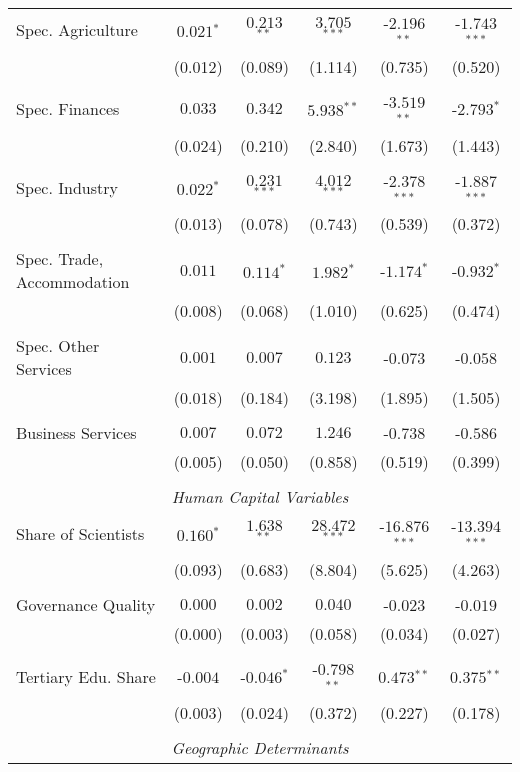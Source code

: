 \documentclass[11pt]{article}
\begin{document}
\begin{table}[!htbp]
{\begin{minipage}{\textwidth}
\begin{tabular}{@{\extracolsep{5pt}} lccccc}
Spec. Agriculture & $0.021$$^{*}$ & $0.213$$^{**}$ & $3.705$$^{***}$ & $ $-$2.196$$^{**}$ & $ $-$1.743$$^{***}$ \\ 
& (0.012) &  (0.089) & (1.114) & (0.735) & (0.520)\\
&\\
Spec. Finances  & $0.033$ & $0.342$ & $5.938$$^{**}$ & $ $-$3.519$$^{**}$ & $ $-$2.793$$^{*}$ \\ 
& (0.024) &  (0.210) & (2.840) & (1.673) & (1.443)\\
&\\
Spec. Industry & $0.022$$^{*}$ & $0.231$$^{***}$ & $4.012$$^{***}$ & $ $-$2.378$$^{***}$ & $ $-$1.887$$^{***}$ \\ 
& (0.013) &  (0.078) & (0.743) & (0.539) & (0.372)\\
&\\
Spec. Trade, Accommodation & $0.011$ & $0.114$$^{*}$ & $1.982$$^{*}$ & $ $-$1.174$$^{*}$ & $ $-$0.932$$^{*}$ \\
& (0.008) &  (0.068) & (1.010) & (0.625) & (0.474)\\
&\\
Spec. Other Services & $ 0.001$ & $ 0.007$ & $ 0.123$ & $ $-$0.073$ & $ $-$0.058$ \\
& (0.018) &  (0.184) & (3.198) & (1.895) & (1.505)\\
&\\
Business Services & $0.007$ & $0.072$ & $1.246$ & $ $-$0.738$ & $ $-$0.586$ \\
& (0.005) &  (0.050) & (0.858) & (0.519) & (0.399)\\
&\\
\multicolumn{6}{c}{\textit{Human Capital Variables}}\\
Share of Scientists & $0.160$$^{*}$ & $1.638$$^{**}$ & $28.472$$^{***}$ & $ $-$16.876$$^{***}$ & $ $-$13.394$$^{***}$ \\
& (0.093) &  (0.683) & (8.804) & (5.625) & (4.263)\\
&\\
Governance Quality & $0.000$ & $0.002$ & $0.040$ & $ $-$0.023$ & $ $-$0.019$ \\
& (0.000) &  (0.003) & (0.058) & (0.034) & (0.027)\\
&\\
Tertiary Edu. Share & $ $-$0.004$ & $ $-$0.046$$^{*}$ & $ $-$0.798$$^{**}$ & $0.473$$^{**}$ & $0.375$$^{**}$ \\
& (0.003) &  (0.024) & (0.372) & (0.227) & (0.178)\\
&\\
\multicolumn{6}{c}{\textit{Geographic Determinants}}\\


\end{tabular}
\end{minipage}}
\end{table}
\end{document}
